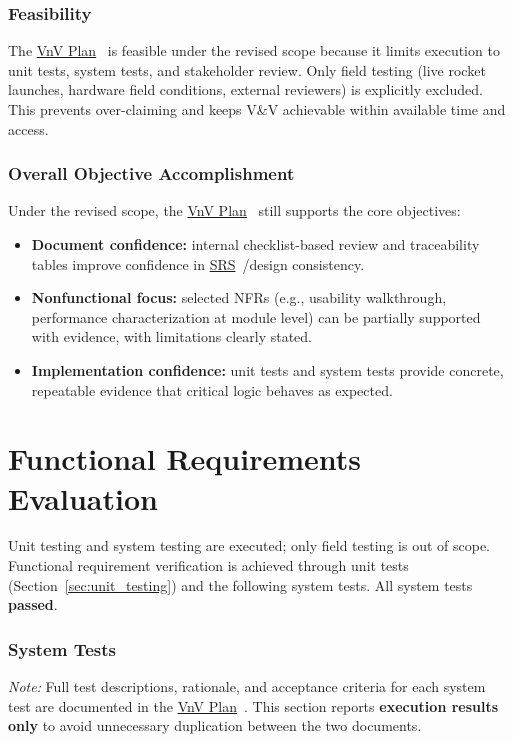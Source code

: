 \documentclass[12pt, titlepage]{article}
\newcommand{\SRS}{\href{../SRS/SRS.pdf}{SRS}}
\newcommand{\VnVPlan}{\href{../VnVPlan/VnVPlan.pdf}{VnV Plan}}
\begin{document}
\subsubsection{Feasibility}
The \VnVPlan~\cite{VnVPlan} is feasible under the revised scope because it
limits execution to unit tests, system tests, and stakeholder review. Only
field testing (live rocket launches, hardware field conditions, external
reviewers) is explicitly excluded. This prevents over-claiming and keeps V\&V
achievable within available time and access.

\subsubsection{Overall Objective Accomplishment}
Under the revised scope, the \VnVPlan~\cite{VnVPlan} still supports the core
objectives:
\begin{itemize}
  \item \textbf{Document confidence:} internal checklist-based review and
        traceability tables improve confidence in \SRS~\cite{SRS}/design consistency.
  \item \textbf{Nonfunctional focus:} selected NFRs (e.g., usability walkthrough,
        performance characterization at module level) can be partially supported
        with evidence, with limitations clearly stated.
  \item \textbf{Implementation confidence:} unit tests and system tests provide
        concrete, repeatable evidence that critical logic behaves as expected.
\end{itemize}

\section{Functional Requirements Evaluation}
\label{sec:fr_eval}

Unit testing and system testing are executed; only field testing is out of
scope. Functional requirement verification is achieved through unit tests
(Section~\ref{sec:unit_testing}) and the following system tests. All system
tests \textbf{passed}.

\subsubsection{System Tests}

\noindent\textit{Note:} Full test descriptions, rationale, and acceptance
criteria for each system test are documented in the
\VnVPlan~\cite{VnVPlan}. This section reports \textbf{execution results
  only} to avoid unnecessary duplication between the two documents.
\end{document}
